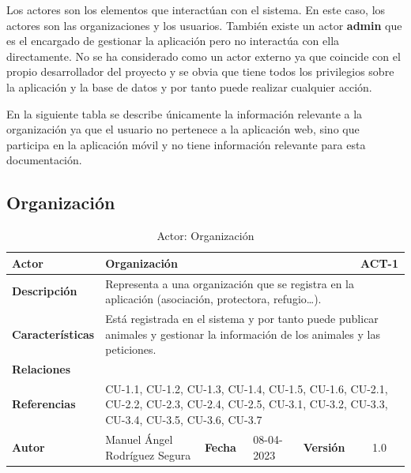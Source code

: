 Los actores son los elementos que interactúan con el sistema. En este caso, los actores son las organizaciones y los usuarios.
También existe un actor \textbf{admin} que es el encargado de gestionar la aplicación pero no interactúa con ella directamente.
No se ha considerado como un actor externo ya que coincide con el propio desarrollador del proyecto y se obvia que
tiene todos los privilegios sobre la aplicación y la base de datos y por tanto puede realizar cualquier acción.

En la siguiente tabla se describe únicamente la información relevante a la organización ya que el usuario no
pertenece a la aplicación web, sino que participa en la aplicación móvil y no tiene información relevante para esta
documentación.


\subsection{Organización}\label{subsec:organizacion}

\begin{table}[H]
\begin{center}
    \begin{adjustbox}{width=\textwidth}
    \begin{tabular}{ | l | l | l | l | c | c | }
        \hline
        \textbf{Actor} & \multicolumn{4}{l|}{Organización} & \cellcolor{gray!50} \textbf{ACT-1}\\
        \hline
        \textbf{Descripción} & \multicolumn{5}{p{0.9\linewidth}|}{Representa a una
        organización que se registra en la aplicación (asociación, protectora, refugio\ldots).} \\
        \hline
        \textbf{Características} & \multicolumn{5}{p{0.5\linewidth}|}{Está registrada
        en el sistema y por tanto puede publicar animales y gestionar la información de los animales y las peticiones.} \\
        \hline
        \textbf{Relaciones} & \multicolumn{5}{p{0.5\linewidth}|}{ } \\
        \hline
        \textbf{Referencias} & \multicolumn{5}{p{0.5\linewidth}|}{CU-1.1, CU-1.2, CU-1.3, CU-1.4, CU-1.5, CU-1.6,
        CU-2.1, CU-2.2, CU-2.3, CU-2.4, CU-2.5, CU-3.1, CU-3.2, CU-3.3, CU-3.4, CU-3.5, CU-3.6, CU-3.7 } \\
        \hline
        \textbf{Autor} & \multicolumn{1}{p{0.25\linewidth}|}{Manuel Ángel Rodríguez Segura} & \textbf{Fecha} &
        08-04-2023     & \textbf{Versión}                                                      & 1.0\\
        \hline
    \end{tabular}
    \end{adjustbox}
    \caption{Actor: Organización}
    \label{tab:organizacion}
\end{center}
\end{table}

